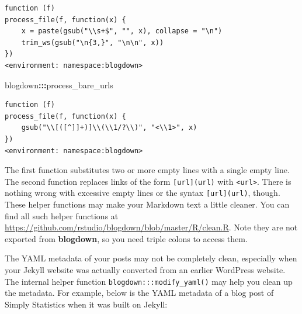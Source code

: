 \documentclass[12pt,]{krantz}
\makeatletter
\newenvironment{Shaded}{\begin{snugshade}}{\end{snugshade}}
\newcommand{\OperatorTok}[1]{\textcolor[rgb]{0.81,0.36,0.00}{\textbf{#1}}}
\newcommand{\NormalTok}[1]{#1}
\newenvironment{kframe}{%
\medskip{}
\setlength{\fboxsep}{.8em}
 \def\at@end@of@kframe{}%
 \ifinner\ifhmode%
  \def\at@end@of@kframe{\end{minipage}}%
  \begin{minipage}{\columnwidth}%
 \fi\fi%
 \def\FrameCommand##1{\hskip\@totalleftmargin \hskip-\fboxsep
 \colorbox{shadecolor}{##1}\hskip-\fboxsep
     \hskip-\linewidth \hskip-\@totalleftmargin \hskip\columnwidth}%
 \MakeFramed {\advance\hsize-\width
   \@totalleftmargin\z@ \linewidth\hsize
   \@setminipage}}%
 {\par\unskip\endMakeFramed%
 \at@end@of@kframe}
\renewenvironment{Shaded}{\begin{kframe}}{\end{kframe}}
\theoremstyle{definition}
\theoremstyle{definition}
\theoremstyle{definition}
\theoremstyle{remark}
\makeatother
\begin{document}
\begin{verbatim}
function (f) 
process_file(f, function(x) {
    x = paste(gsub("\\s+$", "", x), collapse = "\n")
    trim_ws(gsub("\n{3,}", "\n\n", x))
})
<environment: namespace:blogdown>
\end{verbatim}

\begin{Shaded}
\begin{Highlighting}[]
\NormalTok{blogdown}\OperatorTok{:::}\NormalTok{process_bare_urls}
\end{Highlighting}
\end{Shaded}

\begin{verbatim}
function (f) 
process_file(f, function(x) {
    gsub("\\[([^]]+)]\\(\\1/?\\)", "<\\1>", x)
})
<environment: namespace:blogdown>
\end{verbatim}

The first function substitutes two or more empty lines with a single
empty line. The second function replaces links of the form
\texttt{{[}url{]}(url)} with \texttt{\textless{}url\textgreater{}}.
There is nothing wrong with excessive empty lines or the syntax
\texttt{{[}url{]}(url)}, though. These helper functions may make your
Markdown text a little cleaner. You can find all such helper functions
at \url{https://github.com/rstudio/blogdown/blob/master/R/clean.R}. Note
they are not exported from \textbf{blogdown}, so you need triple colons
to access them.

The YAML metadata of your posts may not be completely clean, especially
when your Jekyll website was actually converted from an earlier
WordPress website. The internal helper function
\texttt{blogdown:::modify\_yaml()} may help you clean up the metadata.
For example, below is the YAML metadata of a blog post of Simply
Statistics when it was built on Jekyll:
\end{document}
